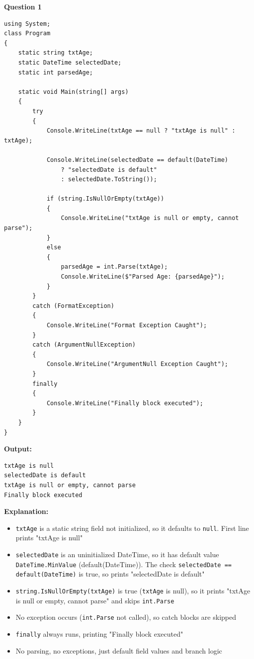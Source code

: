 \textbf{Question 1}
\begin{lstlisting}[language=CSharp, caption={Field Initialization and Exception Handling}]
using System;
class Program
{
    static string txtAge;
    static DateTime selectedDate;
    static int parsedAge;

    static void Main(string[] args)
    {
        try
        {
            Console.WriteLine(txtAge == null ? "txtAge is null" : txtAge);

            Console.WriteLine(selectedDate == default(DateTime)
                ? "selectedDate is default"
                : selectedDate.ToString());

            if (string.IsNullOrEmpty(txtAge))
            {
                Console.WriteLine("txtAge is null or empty, cannot parse");
            }
            else
            {
                parsedAge = int.Parse(txtAge);
                Console.WriteLine($"Parsed Age: {parsedAge}");
            }
        }
        catch (FormatException)
        {
            Console.WriteLine("Format Exception Caught");
        }
        catch (ArgumentNullException)
        {
            Console.WriteLine("ArgumentNull Exception Caught");
        }
        finally
        {
            Console.WriteLine("Finally block executed");
        }
    }
}
\end{lstlisting}

\textbf{Output:}
\begin{verbatim}
txtAge is null
selectedDate is default
txtAge is null or empty, cannot parse
Finally block executed
\end{verbatim}

\textbf{Explanation:}
\begin{itemize}
    \item \texttt{txtAge} is a static string field not initialized, so it defaults to \texttt{null}. First line prints "txtAge is null"
    \item \texttt{selectedDate} is an uninitialized DateTime, so it has default value \texttt{DateTime.MinValue} (default(DateTime)). The check \texttt{selectedDate == default(DateTime)} is true, so prints "selectedDate is default"
    \item \texttt{string.IsNullOrEmpty(txtAge)} is true (\texttt{txtAge} is null), so it prints "txtAge is null or empty, cannot parse" and skips \texttt{int.Parse}
    \item No exception occurs (\texttt{int.Parse} not called), so catch blocks are skipped
    \item \texttt{finally} always runs, printing "Finally block executed"
    \item No parsing, no exceptions, just default field values and branch logic
\end{itemize}

